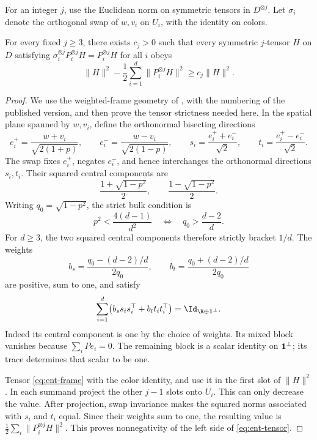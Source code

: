 For an integer \(j\), use the Euclidean norm on symmetric tensors
in \(D^{\otimes j}\). Let \(\sigma_i\) denote the orthogonal swap of
\(w,v_i\) on \(U_i\), with the identity on colors.

\begin{lemma}\label{ent:tensor}
For every fixed \(j\ge3\), there exists \(c_j>0\) such that every
symmetric \(j\)-tensor \(H\) on \(D\) satisfying
\(\sigma_i^{\otimes j}P_i^{\otimes j}H=P_i^{\otimes j}H\) for all
\(i\) obeys
\begin{equation}\label{eq:ent-tensor}
 \|H\|^2-\frac12\sum_{i=1}^d\|P_i^{\otimes j}H\|^2
 \ge c_j\|H\|^2 .
\end{equation}
\end{lemma}

\begin{proof}
We use the weighted-frame geometry of
\citet[Lemma~11.3]{BackhauszSzegedy}, with the numbering of the
published version, and then prove the tensor strictness needed here.
In the spatial plane spanned by \(w,v_i\), define the orthonormal
bisecting directions
\[
 e_i^+=\frac{w+v_i}{\sqrt{2(1+p)}},\qquad
 e_i^-=\frac{w-v_i}{\sqrt{2(1-p)}},\qquad
 s_i=\frac{e_i^++e_i^-}{\sqrt2},\qquad
 t_i=\frac{e_i^+-e_i^-}{\sqrt2}.
\]
The swap fixes \(e_i^+\), negates \(e_i^-\), and hence interchanges
the orthonormal directions \(s_i,t_i\). Their squared central
components are
\[
 \frac{1+\sqrt{1-p^2}}2,\qquad
 \frac{1-\sqrt{1-p^2}}2.
\]
Writing \(q_0=\sqrt{1-p^2}\), the strict bulk condition is
\[
 p^2<\frac{4(d-1)}{d^2}
 \quad\Longleftrightarrow\quad q_0>\frac{d-2}{d}.
\]
For \(d\ge3\), the two squared central components therefore
strictly bracket \(1/d\). The weights
\[
 b_s=\frac{q_0-(d-2)/d}{2q_0},\qquad
 b_t=\frac{q_0+(d-2)/d}{2q_0}
\]
are positive, sum to one, and satisfy
\begin{equation}\label{eq:ent-frame}
 \sum_{i=1}^d\bigl(b_s s_is_i^\top+b_t t_it_i^\top\bigr)
 =\Id_{\R\oplus{\bf1}^{\perp}}.
\end{equation}
Indeed its central component is one by the choice of weights.
Its mixed block vanishes because \(\sum_iPe_i=0\).
The remaining block is a scalar identity on \({\bf1}^{\perp}\);
its trace determines that scalar to be one.

Tensor \eqref{eq:ent-frame} with the color identity, and use it
in the first slot of \(\|H\|^2\). In each summand project the other
\(j-1\) slots onto \(U_i\). This can only decrease the value.
After projection, swap invariance makes the squared norms associated
with \(s_i\) and \(t_i\) equal. Since their weights sum to one,
the resulting value is
\(\frac12\sum_i\|P_i^{\otimes j}H\|^2\).
This proves nonnegativity of the left side of
\eqref{eq:ent-tensor}.


\end{proof}
